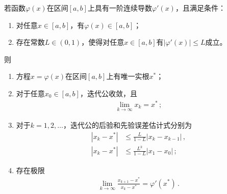 \begin{theorem}[全局收敛性定理]
    若函数$\varphi(x)$在区间$[a,b]$上具有一阶连续导数$\varphi'(x)$，且满足条件：
    \begin{enumerate}
        \item 对任意$x\in[a,b]$，有$\varphi(x)\in[a,b]$；
        \item 存在常数$L\in(0,1)$，使得对任意$x\in[a,b]$有$|\varphi'(x)|\le L$成立。
    \end{enumerate}
    则
    \begin{enumerate}
        \item 方程$x=\varphi(x)$在区间$[a,b]$上有唯一实根$x^*$；
        \item 对于任意$x_0\in[a,b]$，迭代公收敛，且\begin{align}\label{eq:02ex0308}
                  \lim\limits_{k\rightarrow\infty}{x_k}=x^*\, ;
              \end{align}
        \item 对于$k=1,2,\ldots$，迭代公的后验和先验误差估计式分别为
              \begin{align}
                  |x_k-x^*| & \le\frac{L}{1-L}|x_k-x_{k-1}|\, , \label{eq:02ex0309} \\
                  |x_k-x^*| & \le\frac{L^k}{1-L}|x_1-x_0|\, ;\label{eq:02ex0310}
              \end{align}
        \item 存在极限\begin{align}\label{eq:02ex0311}
                  \lim\limits_{k\rightarrow\infty}{\frac{x_{k+1}-x^*}{x_k-x^*}}=\varphi'(x^*)\, .
              \end{align}
    \end{enumerate}
\end{theorem}
